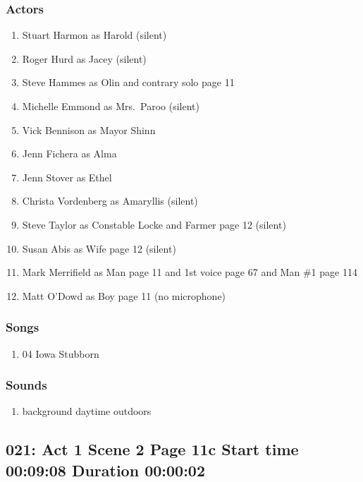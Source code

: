 \subsubsection{Actors}
\begin{enumerate}
\item Stuart Harmon as Harold (silent)
\item Roger Hurd as Jacey (silent)
\item Steve Hammes as Olin and contrary solo page 11
\item Michelle Emmond as Mrs.~Paroo (silent)
\item Vick Bennison as Mayor Shinn
\item Jenn Fichera as Alma
\item Jenn Stover as Ethel
\item Christa Vordenberg as Amaryllis (silent)
\item Steve Taylor as Constable Locke and Farmer page 12 (silent)
\item Susan Abis as Wife page 12 (silent)
\item Mark Merrifield as Man page 11 and 1st voice page 67 and Man \#1 page 114
\item Matt O'Dowd as Boy page 11 (no microphone)
\end{enumerate}

\subsubsection{Songs}
\begin{enumerate}
\item 04 Iowa Stubborn
\end{enumerate}\subsubsection{Sounds}
\begin{enumerate}
\item background daytime outdoors
\end{enumerate}
\subsection{021: Act 1 Scene 2 Page 11c Start time 00:09:08 Duration 00:00:02}

